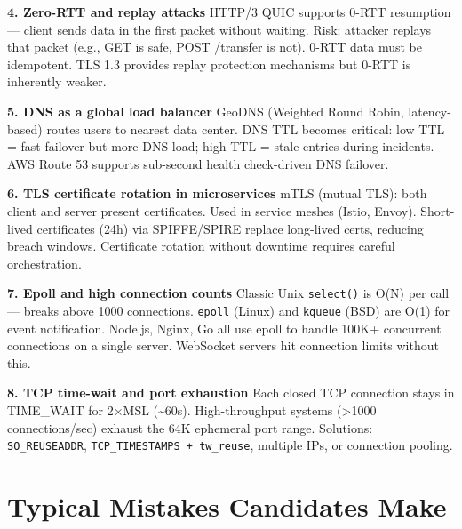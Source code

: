 \documentclass[11pt]{article}
\begin{document}
\textbf{4. Zero-RTT and replay attacks}
HTTP/3 QUIC supports 0-RTT resumption --- client sends data in the first packet without waiting. Risk: attacker replays that packet (e.g., GET is safe, POST /transfer is not). 0-RTT data must be idempotent. TLS 1.3 provides replay protection mechanisms but 0-RTT is inherently weaker.

\textbf{5. DNS as a global load balancer}
GeoDNS (Weighted Round Robin, latency-based) routes users to nearest data center. DNS TTL becomes critical: low TTL = fast failover but more DNS load; high TTL = stale entries during incidents. AWS Route 53 supports sub-second health check-driven DNS failover.

\textbf{6. TLS certificate rotation in microservices}
mTLS (mutual TLS): both client and server present certificates. Used in service meshes (Istio, Envoy). Short-lived certificates (24h) via SPIFFE/SPIRE replace long-lived certs, reducing breach windows. Certificate rotation without downtime requires careful orchestration.

\textbf{7. Epoll and high connection counts}
Classic Unix \texttt{select()} is O(N) per call --- breaks above 1000 connections. \texttt{epoll} (Linux) and \texttt{kqueue} (BSD) are O(1) for event notification. Node.js, Nginx, Go all use epoll to handle 100K+ concurrent connections on a single server. WebSocket servers hit connection limits without this.

\textbf{8. TCP time-wait and port exhaustion}
Each closed TCP connection stays in TIME\_WAIT for 2\(\times\)MSL (\textasciitilde60s). High-throughput systems (\textgreater1000 connections/sec) exhaust the 64K ephemeral port range. Solutions: \texttt{SO\_REUSEADDR}, \texttt{TCP\_TIMESTAMPS\ +\ tw\_reuse}, multiple IPs, or connection pooling.

\section{Typical Mistakes Candidates Make}\label{typical-mistakes-candidates-make}
\end{document}
